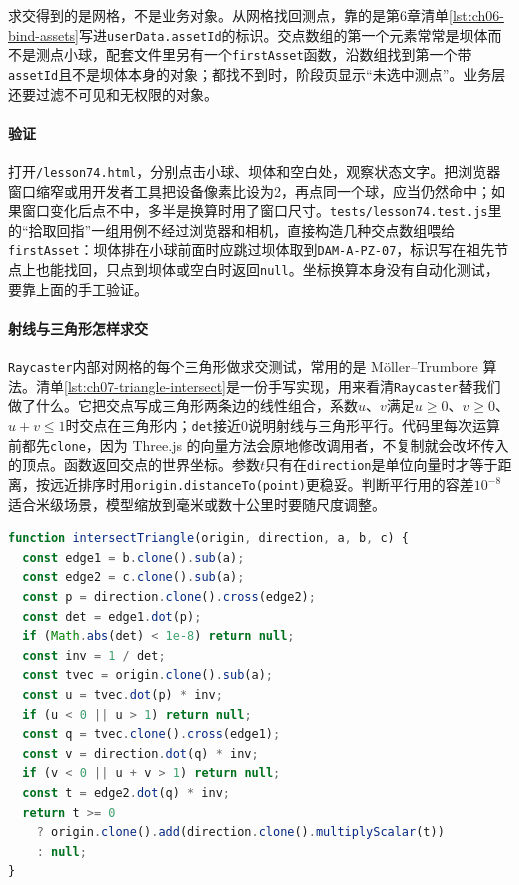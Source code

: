 求交得到的是网格，不是业务对象。从网格找回测点，靠的是第6章清单\ref{lst:ch06-bind-assets}写进\texttt{userData.assetId}的标识。交点数组的第一个元素常常是坝体而不是测点小球，配套文件里另有一个\texttt{firstAsset}函数，沿数组找到第一个带\texttt{assetId}且不是坝体本身的对象；都找不到时，阶段页显示“未选中测点”。业务层还要过滤不可见和无权限的对象。

\paragraph{验证}打开\texttt{/lesson74.html}，分别点击小球、坝体和空白处，观察状态文字。把浏览器窗口缩窄或用开发者工具把设备像素比设为2，再点同一个球，应当仍然命中；如果窗口变化后点不中，多半是换算时用了窗口尺寸。\texttt{tests/lesson74.test.js}里的“拾取回指”一组用例不经过浏览器和相机，直接构造几种交点数组喂给\texttt{firstAsset}：坝体排在小球前面时应跳过坝体取到\texttt{DAM-A-PZ-07}，标识写在祖先节点上也能找回，只点到坝体或空白时返回\texttt{null}。坐标换算本身没有自动化测试，要靠上面的手工验证。

\paragraph{射线与三角形怎样求交}\texttt{Raycaster}内部对网格的每个三角形做求交测试，常用的是 M\"oller--Trumbore 算法。清单\ref{lst:ch07-triangle-intersect}是一份手写实现，用来看清\texttt{Raycaster}替我们做了什么。它把交点写成三角形两条边的线性组合，系数$u$、$v$满足$u\ge0$、$v\ge0$、$u+v\le1$时交点在三角形内；\texttt{det}接近0说明射线与三角形平行。代码里每次运算前都先\texttt{clone}，因为 Three.js 的向量方法会原地修改调用者，不复制就会改坏传入的顶点。函数返回交点的世界坐标。参数$t$只有在\texttt{direction}是单位向量时才等于距离，按远近排序时用\texttt{origin.distanceTo(point)}更稳妥。判断平行用的容差$10^{-8}$适合米级场景，模型缩放到毫米或数十公里时要随尺度调整。

\begin{lstlisting}[label={lst:ch07-triangle-intersect},language=JavaScript,caption={M\"oller--Trumbore 三角形求交}]
function intersectTriangle(origin, direction, a, b, c) {
  const edge1 = b.clone().sub(a);
  const edge2 = c.clone().sub(a);
  const p = direction.clone().cross(edge2);
  const det = edge1.dot(p);
  if (Math.abs(det) < 1e-8) return null;
  const inv = 1 / det;
  const tvec = origin.clone().sub(a);
  const u = tvec.dot(p) * inv;
  if (u < 0 || u > 1) return null;
  const q = tvec.clone().cross(edge1);
  const v = direction.dot(q) * inv;
  if (v < 0 || u + v > 1) return null;
  const t = edge2.dot(q) * inv;
  return t >= 0
    ? origin.clone().add(direction.clone().multiplyScalar(t))
    : null;
}
\end{lstlisting}

